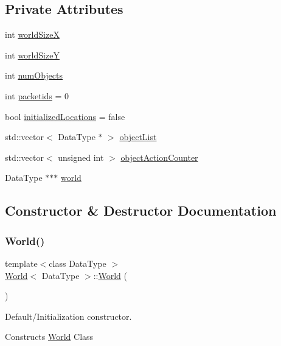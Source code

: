 \subsection*{Private Attributes}
\begin{DoxyCompactItemize}
\item 
int \hyperlink{class_world_a63c69cc806d5b39a6943ef115d9eab83}{world\+SizeX}
\item 
int \hyperlink{class_world_a7a71c24a9af5ca1e66d7ed5300369460}{world\+SizeY}
\item 
int \hyperlink{class_world_a1fe4efb713f70d780c03481db59e403f}{num\+Objects}
\item 
int \hyperlink{class_world_a6db242c73b23c4df1c6d1702b390864d}{packetids} = 0
\item 
bool \hyperlink{class_world_a6f29951c9b3aa2135da80fc0247e3b51}{initialized\+Locations} = false
\item 
std\+::vector$<$ Data\+Type $\ast$ $>$ \hyperlink{class_world_a4a3b31533f61802401a1a624a3bdf3e9}{object\+List}
\item 
std\+::vector$<$ unsigned int $>$ \hyperlink{class_world_a8571b88a01f16816faa26bd31bcf465d}{object\+Action\+Counter}
\item 
Data\+Type $\ast$$\ast$$\ast$ \hyperlink{class_world_a647a2a9a2645df4a15bd0a4565d689b9}{world}
\end{DoxyCompactItemize}


\subsection{Constructor \& Destructor Documentation}
\hypertarget{class_world_a7edba001158e18402f6855ac5f40ed65}{}\label{class_world_a7edba001158e18402f6855ac5f40ed65} 
\subsubsection{\texorpdfstring{World()}{World()}}
{\footnotesize\ttfamily template$<$class Data\+Type $>$ \\
\hyperlink{class_world}{World}$<$ Data\+Type $>$\+::\hyperlink{class_world}{World} (\begin{DoxyParamCaption}{ }\end{DoxyParamCaption})}



Default/\+Initialization constructor. 

Constructs \hyperlink{class_world}{World} Class

